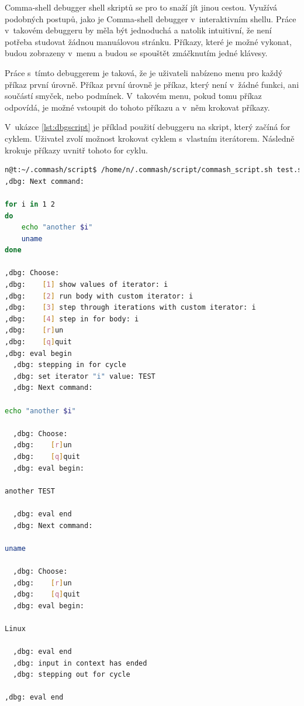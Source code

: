 \documentclass[thesis=M,czech]{FITthesis}[2012/06/26]
\begin{document}
Comma-shell debugger shell skriptů se pro to snaží jít jinou cestou. Využívá podobných postupů, jako je Comma-shell debugger v~interaktivním shellu. Práce v~takovém debuggeru by měla být jednoduchá a natolik intuitivní, že není potřeba studovat žádnou manuálovou stránku. Příkazy, které je možné vykonat, budou zobrazeny v~menu a budou se spouštět zmáčknutím jedné klávesy.

Práce s~tímto debuggerem je taková, že je uživateli nabízeno menu pro každý příkaz první úrovně. Příkaz první úrovně je příkaz, který není v~žádné funkci, ani součástí smyček, nebo podmínek. V~takovém menu, pokud tomu příkaz odpovídá, je možné vstoupit do tohoto příkazu a v~něm krokovat příkazy.

V~ukázce \ref{lst:dbgscript} je příklad použití debuggeru na skript, který začíná for cyklem. Uživatel zvolí možnost krokovat cyklem s~vlastním iterátorem. Následně krokuje příkazy uvnitř tohoto for cyklu.

\noindent
\begin{minipage}{\linewidth}
\begin{lstlisting}[language=bash, caption={Debugger shell skriptu}, label={lst:dbgscript}]
n@t:~/.commash/script$ /home/n/.commash/script/commash_script.sh test.sh
,dbg: Next command:

for i in 1 2
do
	echo "another $i"
	uname
done

,dbg: Choose:
,dbg:    [1] show values of iterator: i
,dbg:    [2] run body with custom iterator: i
,dbg:    [3] step through iterations with custom iterator: i
,dbg:    [4] step in for body: i
,dbg:    [r]un
,dbg:    [q]quit
,dbg: eval begin
  ,dbg: stepping in for cycle
  ,dbg: set iterator "i" value: TEST
  ,dbg: Next command:

echo "another $i"

  ,dbg: Choose:
  ,dbg:    [r]un
  ,dbg:    [q]quit
  ,dbg: eval begin:

another TEST

  ,dbg: eval end
  ,dbg: Next command:

uname

  ,dbg: Choose:
  ,dbg:    [r]un
  ,dbg:    [q]quit
  ,dbg: eval begin:

Linux

  ,dbg: eval end
  ,dbg: input in context has ended
  ,dbg: stepping out for cycle

,dbg: eval end
\end{lstlisting}
\end{minipage}
\end{document}
